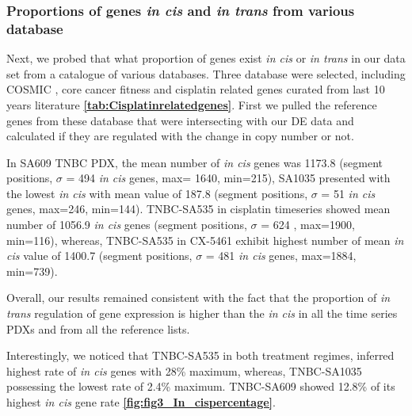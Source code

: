\subsubsection{Proportions of genes \textit{in cis} and \textit{in trans} from various database}
Next, we probed that what proportion of genes exist \textit{in cis} or \textit{in trans} in our data set from a catalogue of various databases.
Three database were selected, including COSMIC \cite{vogelstein2013cancer}, core cancer fitness \cite{behan2019prioritization} and cisplatin related genes curated from last 10 years literature \textbf{\autoref{tab:Cisplatinrelatedgenes}}.
First we pulled the reference genes from these database that were intersecting with our \ac{DE} data and calculated if they are regulated with the change in copy number or not.

 In  SA609 TNBC PDX, the mean number of \textit{in cis} genes was 1173.8 (segment positions, $\sigma$ = 494 \textit{in cis} genes, max= 1640, min=215), SA1035 presented with the lowest \textit{in cis} with
 mean value of 187.8 (segment positions, $\sigma$ = 51 \textit{in cis} genes, max=246, min=144). TNBC-SA535 in cisplatin timeseries showed mean number of 1056.9 \textit{in cis} genes (segment positions, $\sigma$ = 624 , max=1900, min=116), whereas, TNBC-SA535 in CX-5461 exhibit highest number of mean \textit{in cis} value of 1400.7 (segment positions, $\sigma$ = 481 \textit{in cis} genes, max=1884, min=739).
 
 Overall, our results remained consistent with the fact that the proportion of \textit{in trans} regulation of gene expression is higher than the \textit{in cis} in all the time series PDXs and from all the reference lists.   
 
 Interestingly, we noticed that TNBC-SA535 in both treatment regimes, inferred highest rate of \textit{in cis} genes with 28\% maximum, whereas, TNBC-SA1035 possessing the lowest rate of 2.4\% maximum. TNBC-SA609  showed 12.8\% of its highest \textit{in cis} gene rate \textbf{\autoref{fig:fig3_In_cispercentage}}.


